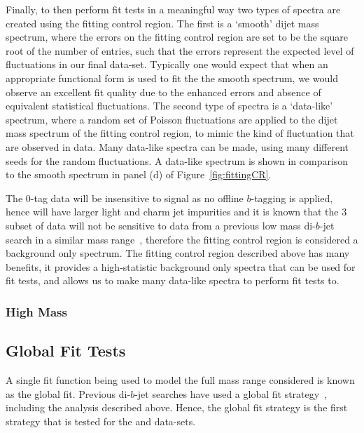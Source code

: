 Finally, to then perform fit tests in a meaningful way two types of spectra are created using the fitting control region.
The first is a `smooth' dijet mass spectrum, where the errors on the fitting control region are set to be the square root of the number of entries,
such that the errors represent the expected level of fluctuations in our final data-set.
Typically one would expect that when an appropriate functional form is used to fit the the smooth spectrum,
we would observe an excellent fit quality due to the enhanced errors and absence of equivalent statistical fluctuations.
The second type of spectra is a `data-like' spectrum, where a random set of Poisson fluctuations are applied to the dijet mass spectrum of the fitting control region,
to mimic the kind of fluctuation that are observed in data.
Many data-like spectra can be made, using many different seeds for the random fluctuations.
A data-like spectrum is shown in comparison to the smooth spectrum in panel (d) of Figure~\ref{fig:fittingCR}.

The 0-tag data will be insensitive to signal as no offline $b$-tagging is applied, hence will have larger light and charm jet impurities
and it is known that the 3 \ifb{} subset of data will not be sensitive to data from a previous low mass di-$b$-jet search in a similar mass range~\cite{dibjet-lhcp_conf},
therefore the fitting control region is considered a background only spectrum.
The fitting control region described above has many benefits,
it provides a high-statistic background only spectra that can be used for fit tests,
and allows us to make many data-like spectra to perform fit tests to.


\subsubsection{High Mass}
\label{sec:highmass_bkgsample}

\newpage
\subsection{Global Fit Tests}
\label{sec:globalfit}

A single fit function being used to model the full mass range considered is known as the global fit.
Previous di-$b$-jet searches have used a global fit strategy~\cite{dibjet-mori16_paper}, including the \summer{} analysis described above.
Hence, the global fit strategy is the first strategy that is tested for the \lm{} and \hm{} data-sets.

